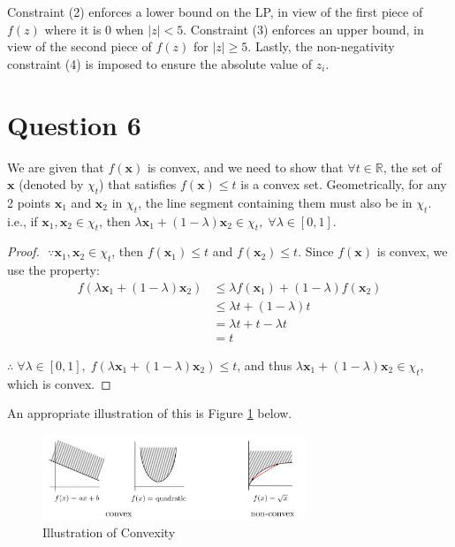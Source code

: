 \documentclass[12pt]{article}
\begin{document}
\noindent Constraint (2) enforces a lower bound on the LP, in view of the first piece of $f(z)$ where it is $0$ when $|z| < 5$. Constraint (3) enforces an upper bound, in view of the second piece of $f(z)$ for $|z| \geq 5$. Lastly, the non-negativity constraint (4) is imposed to ensure the absolute value of $z_i$.  

\section*{Question 6}
We are given that $f(\mathbf{x})$ is convex, and we need to show that $\forall t \in \mathbb{R}$, the set of $\mathbf{x}$ (denoted by $\chi_t$) that satisfies $f(\mathbf{x}) \leq t$ is a convex set. Geometrically, for any 2 points $\mathbf{x}_1$ and $\mathbf{x}_2$ in $\chi_t$, the line segment containing them must also be in $\chi_t$. i.e., if $\mathbf{x}_1, \mathbf{x}_2 \in \chi_t$, then $\lambda \mathbf{x}_1 + (1-\lambda)\mathbf{x}_2 \in \chi_t, \; \forall \lambda \in [0,1]$. \\ 

\begin{proof}
    $ $ \newline $\because \mathbf{x}_1, \mathbf{x}_2 \in \chi_t$, then $f(\mathbf{x}_1) \leq t$ and $f(\mathbf{x}_2) \leq t$. Since $f(\mathbf{x})$ is convex, we use the property: \\ 
    \begin{align*}
        f(\lambda \mathbf{x}_1 + (1-\lambda) \mathbf{x}_2) & \leq \lambda f(\mathbf{x}_1) + (1-\lambda) f(\mathbf{x}_2) \\ 
        & \leq \lambda t + (1- \lambda) t \\ 
        &= \lambda t + t - \lambda t \\ 
        &= t
    \end{align*}

    \noindent $\therefore \; \forall \lambda \in [0,1], \; f(\lambda \mathbf{x}_1 + (1-\lambda) \mathbf{x}_2) \leq t$, and thus $\lambda \mathbf{x}_1 + (1-\lambda) \mathbf{x}_2 \in \chi_t$, which is convex.  
\end{proof}


\noindent An appropriate illustration of this is Figure \ref{fig:6-convexfns} below. 

\begin{figure}[H]
    \centering
    \includegraphics[width=0.7\textwidth]{Images/convexityfn.png}
    \caption{Illustration of Convexity}
    \label{fig:6-convexfns}
\end{figure} 
\end{document}
